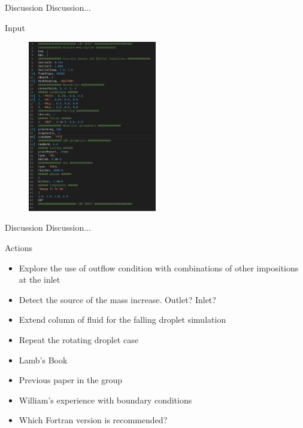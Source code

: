 \documentclass{beamer}
\begin{document}
	\begin{frame}{Discussion}
		Discussion...
	\end{frame}
	
	\begin{frame}{Input}
		\begin{figure}
			\centering
			\includegraphics[width=0.5\textwidth]{pics/modelInput.png}
		\end{figure}
	\end{frame}
	
	\begin{frame}{Discussion}
		Discussion...
	\end{frame}
	
	\begin{frame}{Actions}
		\begin{itemize}
			\item Explore the use of outflow condition with combinations of other impositions at the inlet
			\item Detect the source of the mass increase. Outlet? Inlet?
			\item Extend column of fluid for the falling droplet simulation
			\item Repeat the rotating droplet case
			\item Lamb's Book
			\item Previous paper in the group
			\item William's experience with boundary conditions
			\item Which Fortran version is recommended?
		\end{itemize}
	\end{frame}
	
\end{document}

